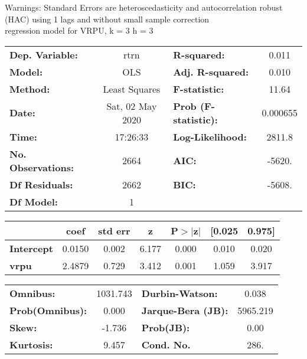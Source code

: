Warnings: \newline
 [1] Standard Errors are heteroscedasticity and autocorrelation robust (HAC) using 1 lags and without small sample correction\\ 

regression model for VRPU, k = 3 h = 3\begin{center}
\begin{tabular}{lclc}
\toprule
\textbf{Dep. Variable:}    &       rtrn       & \textbf{  R-squared:         } &     0.011   \\
\textbf{Model:}            &       OLS        & \textbf{  Adj. R-squared:    } &     0.010   \\
\textbf{Method:}           &  Least Squares   & \textbf{  F-statistic:       } &     11.64   \\
\textbf{Date:}             & Sat, 02 May 2020 & \textbf{  Prob (F-statistic):} &  0.000655   \\
\textbf{Time:}             &     17:26:33     & \textbf{  Log-Likelihood:    } &    2811.8   \\
\textbf{No. Observations:} &        2664      & \textbf{  AIC:               } &    -5620.   \\
\textbf{Df Residuals:}     &        2662      & \textbf{  BIC:               } &    -5608.   \\
\textbf{Df Model:}         &           1      & \textbf{                     } &             \\
\bottomrule
\end{tabular}
\begin{tabular}{lcccccc}
                   & \textbf{coef} & \textbf{std err} & \textbf{z} & \textbf{P$> |$z$|$} & \textbf{[0.025} & \textbf{0.975]}  \\
\midrule
\textbf{Intercept} &       0.0150  &        0.002     &     6.177  &         0.000        &        0.010    &        0.020     \\
\textbf{vrpu}      &       2.4879  &        0.729     &     3.412  &         0.001        &        1.059    &        3.917     \\
\bottomrule
\end{tabular}
\begin{tabular}{lclc}
\textbf{Omnibus:}       & 1031.743 & \textbf{  Durbin-Watson:     } &    0.038  \\
\textbf{Prob(Omnibus):} &   0.000  & \textbf{  Jarque-Bera (JB):  } & 5965.219  \\
\textbf{Skew:}          &  -1.736  & \textbf{  Prob(JB):          } &     0.00  \\
\textbf{Kurtosis:}      &   9.457  & \textbf{  Cond. No.          } &     286.  \\
\bottomrule
\end{tabular}
\end{center}

